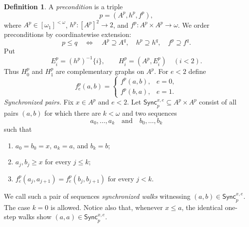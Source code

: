 \documentclass{amsart}
\numberwithin{equation}{section}
\theoremstyle{definition}
\newtheorem{definition}[theorem]{Definition}
\theoremstyle{remark}
\begin{document}
\begin{definition}\label{def:preconditions}
A \emph{precondition} is a triple
\begin{displaymath}
 p=(A^p,h^p,f^p),
\end{displaymath}
where $A^p\in[\omega_1]^{<\omega}$,
$h^p:[A^p]^2\to 2$, and $f^p:A^p\times A^p\to\omega$.
We order preconditions by coordinatewise extension:
\begin{displaymath}
 p\leq q
 \quad\Longleftrightarrow\quad
 A^p\supseteq A^q,\quad h^p\supseteq h^q,\quad
 f^p\supseteq f^q.
\end{displaymath}
Put
\begin{displaymath}
 E_i^p=(h^p)^{-1}\{i\},\qquad H_i^p=(A^p,E_i^p)
 \quad(i<2).
\end{displaymath}
Thus $H_0^p$ and $H_1^p$ are complementary graphs on $A^p$.
For $e<2$ define
\begin{displaymath}
 f_e^p(a,b)=
 \begin{cases}
 f^p(a,b),&e=0,\\
 f^p(b,a),&e=1.
 \end{cases}
\end{displaymath}
\smallskip
\noindent\emph{Synchronized pairs.}
Fix $x\in A^p$ and $e<2$.  Let
$\mathsf{Sync}^{x,e}_p\subseteq A^p\times A^p$ consist of all pairs
$(a,b)$ for which there are $k<\omega$ and two sequences
\begin{displaymath}
 a_0,\ldots,a_k\quad\text{and}\quad b_0,\ldots,b_k
\end{displaymath}
such that
\begin{enumerate}
\item $a_0=b_0=x$, $a_k=a$, and $b_k=b$;
\item $a_j,b_j\geq x$ for every $j\leq k$;
\item
$f_e^p(a_j,a_{j+1})=f_e^p(b_j,b_{j+1})$ for every $j<k$.
\end{enumerate}
We call such a pair of sequences \emph{synchronized walks} witnessing
$(a,b)\in\mathsf{Sync}^{x,e}_p$.
The case $k=0$ is allowed.  Notice also that, whenever $x\leq a$,
the identical one-step walks show
$(a,a)\in\mathsf{Sync}^{x,e}_p$.

\begin{figure}[ht]
\centering
{}
\end{figure}
\end{definition}
\end{document}
